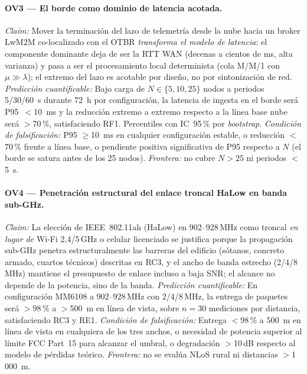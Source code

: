 \paragraph{OV3 --- El borde como dominio de latencia acotada.}
\emph{Claim:} Mover la terminación del lazo de telemetría desde la nube hacia un broker LwM2M co-localizado con el OTBR \emph{transforma el modelo de latencia}: el componente dominante deja de ser la RTT WAN (decenas a cientos de ms, alta varianza) y pasa a ser el procesamiento local determinista (cola M/M/1 con $\mu\gg\lambda$); el extremo del lazo es acotable por diseño, no por sintonización de red.
\emph{Predicción cuantificable:} Bajo carga de $N\in\{5,10,25\}$ nodos a periodos 5/30/60~s durante 72~h por configuración, la latencia de ingesta en el borde será P95~$<$10~ms y la reducción extremo a extremo respecto a la línea base nube será $>$70\,\%, satisfaciendo RF1. Percentiles con IC~95\,\% por \emph{bootstrap}.
\emph{Condición de falsificación:} P95 $\geq$10~ms en cualquier configuración estable, o reducción $<$70\,\% frente a línea base, o pendiente positiva significativa de P95 respecto a $N$ (el borde se satura antes de los 25 nodos). \emph{Frontera:} no cubre $N>25$ ni periodos $<$5~s.

\paragraph{OV4 --- Penetración estructural del enlace troncal HaLow en banda sub-GHz.}
\emph{Claim:} La elección de IEEE~802.11ah (HaLow) en 902--928\,MHz como troncal \emph{en lugar de} Wi-Fi 2{,}4/5\,GHz o celular licenciado se justifica porque la propagación sub-GHz penetra estructuralmente las barreras del edificio (sótanos, concreto armado, cuartos técnicos) descritas en RC3, y el ancho de banda estrecho (2/4/8\,MHz) mantiene el presupuesto de enlace incluso a baja SNR; el alcance no depende de la potencia, sino de la banda.
\emph{Predicción cuantificable:} En configuración MM6108 a 902--928\,MHz con 2/4/8\,MHz, la entrega de paquetes será $>$98\,\% a $>$500~m en línea de vista, sobre $n=30$ mediciones por distancia, satisfaciendo RC3 y RE1.
\emph{Condición de falsificación:} Entrega $<$98\,\% a 500~m en línea de vista en cualquiera de los tres anchos, o necesidad de potencia superior al límite FCC Part~15 para alcanzar el umbral, o degradación $>$10\,dB respecto al modelo de pérdidas teórico. \emph{Frontera:} no se evalúa NLoS rural ni distancias $>$1\,000~m.

